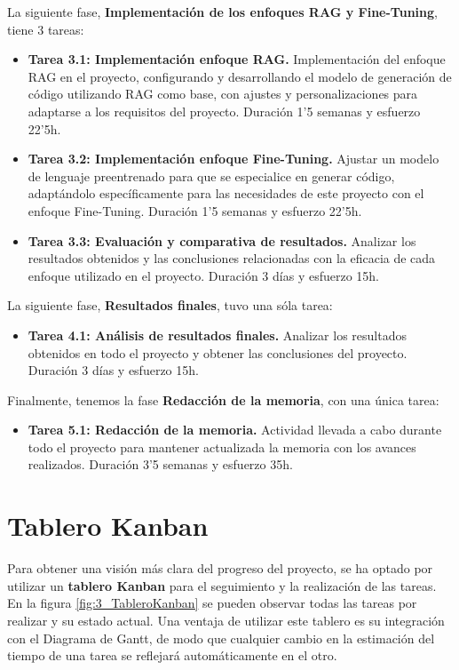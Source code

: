 La siguiente fase, \textbf{Implementación de los enfoques \acrshort{RAG} y Fine-Tuning}, tiene 3 tareas:
\begin{itemize}
    \item \textbf{Tarea 3.1: Implementación enfoque \acrshort{RAG}.} Implementación del enfoque RAG en el proyecto, configurando y desarrollando el modelo de generación de código utilizando \acrfull{RAG} como base, con ajustes y personalizaciones para adaptarse a los requisitos del proyecto. Duración 1'5 semanas y esfuerzo 22'5h.
    \item \textbf{Tarea 3.2: Implementación enfoque Fine-Tuning.}
     Ajustar un modelo de lenguaje preentrenado para que se especialice en generar código, adaptándolo específicamente para las necesidades de este proyecto con el enfoque Fine-Tuning. Duración 1'5 semanas y esfuerzo 22'5h.
     \item \textbf{Tarea 3.3: Evaluación y comparativa de resultados.} Analizar los resultados obtenidos y las conclusiones relacionadas con la eficacia de cada enfoque utilizado en el proyecto. Duración 3 días y esfuerzo 15h.
\end{itemize}

La siguiente fase, \textbf{Resultados finales}, tuvo una sóla tarea:
\begin{itemize}
    \item \textbf{Tarea 4.1: Análisis de resultados finales.} Analizar los resultados obtenidos en todo el proyecto y obtener las conclusiones del proyecto. Duración 3 días y esfuerzo 15h.
\end{itemize}

Finalmente, tenemos la fase \textbf{Redacción de la memoria}, con una única tarea:
\begin{itemize}
    \item \textbf{Tarea 5.1: Redacción de la memoria.} Actividad llevada a cabo durante todo el proyecto para mantener actualizada la memoria con los avances realizados. Duración 3'5 semanas y esfuerzo 35h.
\end{itemize}

\section{Tablero Kanban}
Para obtener una visión más clara del progreso del proyecto, se ha optado por utilizar un \textbf{tablero Kanban} \cite{tableroKanban} para el seguimiento y la realización de las tareas. En la figura \ref{fig:3_TableroKanban}  se pueden observar todas las tareas por realizar y su estado actual. Una ventaja de utilizar este tablero es su integración con el Diagrama de Gantt, de modo que cualquier cambio en la estimación del tiempo de una tarea se reflejará automáticamente en el otro.

